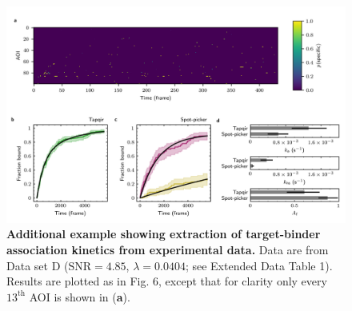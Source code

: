 \begin{figure}[t]
\centering
\includegraphics[width=\textwidth]{extended-data/figure6.png}
\caption{\textbf{Additional example showing extraction of target-binder association kinetics from experimental data.} Data are from Data set D ($\textrm{SNR} = 4.85$, $\lambda = 0.0404$; see Extended Data Table 1).  Results are plotted as in Fig. 6, except that for clarity only every $13^\mathrm{th}$ AOI is shown in (\textbf{a}).}
\label{fig:greb}
\end{figure}
\clearpage
\pagebreak

